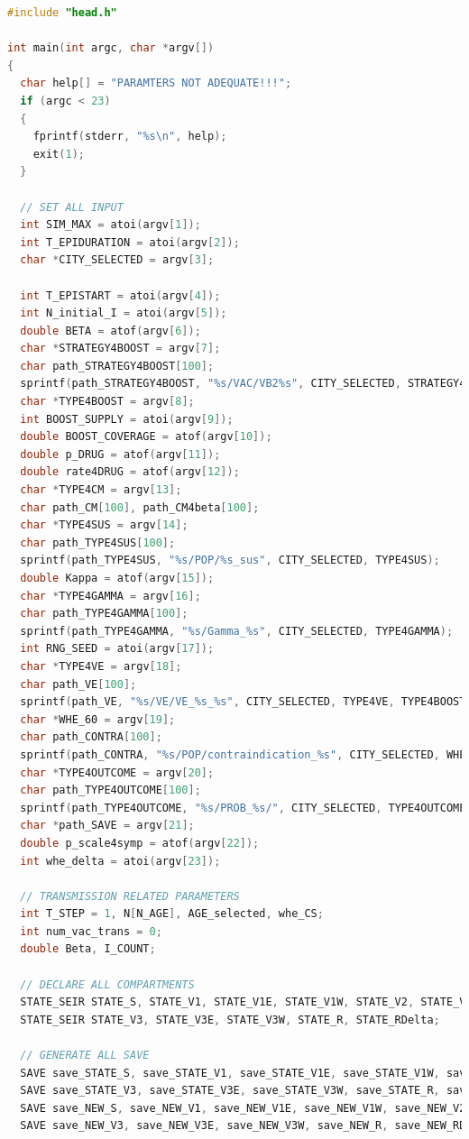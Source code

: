 \documentclass[bwprint]{gmcmthesis}
\numberwithin{figure}{section}
\begin{document}
 
 \begin{lstlisting}[language=C] 
% 主函数
#include "head.h"

int main(int argc, char *argv[])
{
  char help[] = "PARAMTERS NOT ADEQUATE!!!";
  if (argc < 23)
  {
    fprintf(stderr, "%s\n", help);
    exit(1);
  }

  // SET ALL INPUT
  int SIM_MAX = atoi(argv[1]);
  int T_EPIDURATION = atoi(argv[2]);
  char *CITY_SELECTED = argv[3];

  int T_EPISTART = atoi(argv[4]);
  int N_initial_I = atoi(argv[5]);
  double BETA = atof(argv[6]);
  char *STRATEGY4BOOST = argv[7];
  char path_STRATEGY4BOOST[100];
  sprintf(path_STRATEGY4BOOST, "%s/VAC/VB2%s", CITY_SELECTED, STRATEGY4BOOST);
  char *TYPE4BOOST = argv[8];
  int BOOST_SUPPLY = atoi(argv[9]);
  double BOOST_COVERAGE = atof(argv[10]);
  double p_DRUG = atof(argv[11]);
  double rate4DRUG = atof(argv[12]);
  char *TYPE4CM = argv[13];
  char path_CM[100], path_CM4beta[100];
  char *TYPE4SUS = argv[14];
  char path_TYPE4SUS[100];
  sprintf(path_TYPE4SUS, "%s/POP/%s_sus", CITY_SELECTED, TYPE4SUS);
  double Kappa = atof(argv[15]);
  char *TYPE4GAMMA = argv[16];
  char path_TYPE4GAMMA[100];
  sprintf(path_TYPE4GAMMA, "%s/Gamma_%s", CITY_SELECTED, TYPE4GAMMA);
  int RNG_SEED = atoi(argv[17]);
  char *TYPE4VE = argv[18];
  char path_VE[100];
  sprintf(path_VE, "%s/VE/VE_%s_%s", CITY_SELECTED, TYPE4VE, TYPE4BOOST);
  char *WHE_60 = argv[19];
  char path_CONTRA[100];
  sprintf(path_CONTRA, "%s/POP/contraindication_%s", CITY_SELECTED, WHE_60);
  char *TYPE4OUTCOME = argv[20];
  char path_TYPE4OUTCOME[100];
  sprintf(path_TYPE4OUTCOME, "%s/PROB_%s/", CITY_SELECTED, TYPE4OUTCOME);
  char *path_SAVE = argv[21];
  double p_scale4symp = atof(argv[22]);
  int whe_delta = atoi(argv[23]);

  // TRANSMISSION RELATED PARAMETERS
  int T_STEP = 1, N[N_AGE], AGE_selected, whe_CS;
  int num_vac_trans = 0;
  double Beta, I_COUNT;

  // DECLARE ALL COMPARTMENTS
  STATE_SEIR STATE_S, STATE_V1, STATE_V1E, STATE_V1W, STATE_V2, STATE_V2E, STATE_V2W;
  STATE_SEIR STATE_V3, STATE_V3E, STATE_V3W, STATE_R, STATE_RDelta;

  // GENERATE ALL SAVE
  SAVE save_STATE_S, save_STATE_V1, save_STATE_V1E, save_STATE_V1W, save_STATE_V2, save_STATE_V2E, save_STATE_V2W;
  SAVE save_STATE_V3, save_STATE_V3E, save_STATE_V3W, save_STATE_R, save_STATE_RDelta;
  SAVE save_NEW_S, save_NEW_V1, save_NEW_V1E, save_NEW_V1W, save_NEW_V2, save_NEW_V2E, save_NEW_V2W;
  SAVE save_NEW_V3, save_NEW_V3E, save_NEW_V3W, save_NEW_R, save_NEW_RDelta;


\end{lstlisting}
\end{document}

